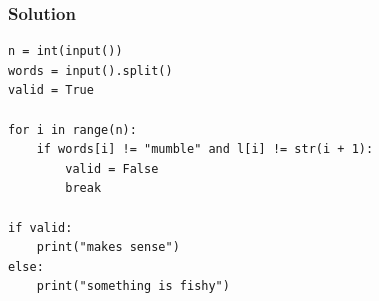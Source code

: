 \documentclass{beamer}
\begin{document}
\begin{frame}
    \frametitle{Solution}
    \begin{verbatim}
n = int(input())
words = input().split()
valid = True

for i in range(n):
    if words[i] != "mumble" and l[i] != str(i + 1):
        valid = False
        break

if valid:
    print("makes sense")
else:
    print("something is fishy")
    \end{verbatim}
\end{frame}
\end{document}
